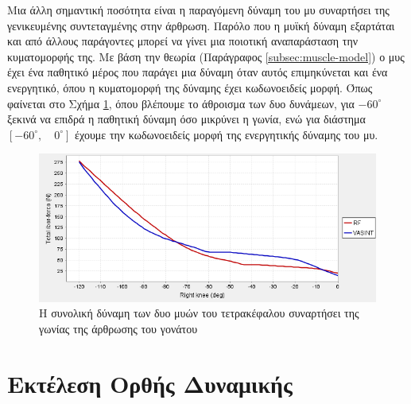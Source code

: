 Μια άλλη σημαντική ποσότητα είναι η παραγόμενη δύναμη του μυ συναρτήσει της γενικευμένης συντεταγμένης στην άρθρωση. Παρόλο που η μυϊκή δύναμη εξαρτάται και από άλλους παράγοντες μπορεί να γίνει μια ποιοτική αναπαράσταση την κυματομορφής της. Με βάση την θεωρία (Παράγραφος \ref{subsec:muscle-model}) ο μυς έχει ένα παθητικό μέρος που παράγει μια δύναμη όταν αυτός επιμηκύνεται και ένα ενεργητικό, όπου η κυματομορφή της δύναμης έχει κωδωνοειδείς μορφή. Όπως φαίνεται στο Σχήμα \ref{fig:total-fiber-force}, όπου βλέπουμε το άθροισμα των δυο δυνάμεων, για $-60^{\circ}$ ξεκινά να επιδρά η παθητική δύναμη όσο μικρύνει η γωνία, ενώ για διάστημα $[-60^{\circ},\quad 0^{\circ}]$ έχουμε την κωδωνοειδείς μορφή της ενεργητικής δύναμης του μυ.

\begin{figure}[H]
    \centering
    \includegraphics[width=0.8\linewidth, keepaspectratio]{fig/total-fiber-force.png}
    \caption{Η συνολική δύναμη των δυο μυών του τετρακέφαλου συναρτήσει της γωνίας της άρθρωσης του γονάτου}
    \label{fig:total-fiber-force}
\end{figure}

\section{Εκτέλεση Ορθής Δυναμικής}

